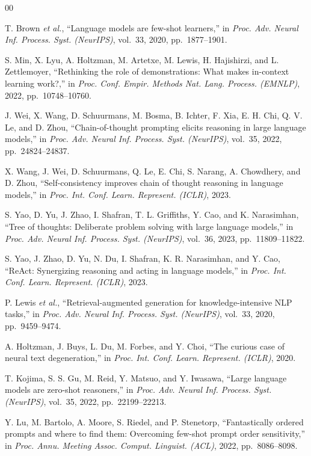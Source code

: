 \documentclass[conference]{IEEEtran}
\begin{document}
\begin{thebibliography}{00}

 T. Brown \textit{et al.}, ``Language models are few-shot learners,'' in \textit{Proc. Adv. Neural Inf. Process. Syst. (NeurIPS)}, vol.\ 33, 2020, pp.\ 1877--1901.

 S. Min, X. Lyu, A. Holtzman, M. Artetxe, M. Lewis, H. Hajishirzi, and L. Zettlemoyer, ``Rethinking the role of demonstrations: What makes in-context learning work?,'' in \textit{Proc. Conf. Empir. Methods Nat. Lang. Process. (EMNLP)}, 2022, pp.\ 10748--10760.

 J. Wei, X. Wang, D. Schuurmans, M. Bosma, B. Ichter, F. Xia, E. H. Chi, Q. V. Le, and D. Zhou, ``Chain-of-thought prompting elicits reasoning in large language models,'' in \textit{Proc. Adv. Neural Inf. Process. Syst. (NeurIPS)}, vol.\ 35, 2022, pp.\ 24824--24837.

 X. Wang, J. Wei, D. Schuurmans, Q. Le, E. Chi, S. Narang, A. Chowdhery, and D. Zhou, ``Self-consistency improves chain of thought reasoning in language models,'' in \textit{Proc. Int. Conf. Learn. Represent. (ICLR)}, 2023.

 S. Yao, D. Yu, J. Zhao, I. Shafran, T. L. Griffiths, Y. Cao, and K. Narasimhan, ``Tree of thoughts: Deliberate problem solving with large language models,'' in \textit{Proc. Adv. Neural Inf. Process. Syst. (NeurIPS)}, vol.\ 36, 2023, pp.\ 11809--11822.

 S. Yao, J. Zhao, D. Yu, N. Du, I. Shafran, K. R. Narasimhan, and Y. Cao, ``ReAct: Synergizing reasoning and acting in language models,'' in \textit{Proc. Int. Conf. Learn. Represent. (ICLR)}, 2023.

 P. Lewis \textit{et al.}, ``Retrieval-augmented generation for knowledge-intensive NLP tasks,'' in \textit{Proc. Adv. Neural Inf. Process. Syst. (NeurIPS)}, vol.\ 33, 2020, pp.\ 9459--9474.

 A. Holtzman, J. Buys, L. Du, M. Forbes, and Y. Choi, ``The curious case of neural text degeneration,'' in \textit{Proc. Int. Conf. Learn. Represent. (ICLR)}, 2020.

 T. Kojima, S. S. Gu, M. Reid, Y. Matsuo, and Y. Iwasawa, ``Large language models are zero-shot reasoners,'' in \textit{Proc. Adv. Neural Inf. Process. Syst. (NeurIPS)}, vol.\ 35, 2022, pp.\ 22199--22213.

 Y. Lu, M. Bartolo, A. Moore, S. Riedel, and P. Stenetorp, ``Fantastically ordered prompts and where to find them: Overcoming few-shot prompt order sensitivity,'' in \textit{Proc. Annu. Meeting Assoc. Comput. Linguist. (ACL)}, 2022, pp.\ 8086--8098.


\end{thebibliography}
\end{document}
